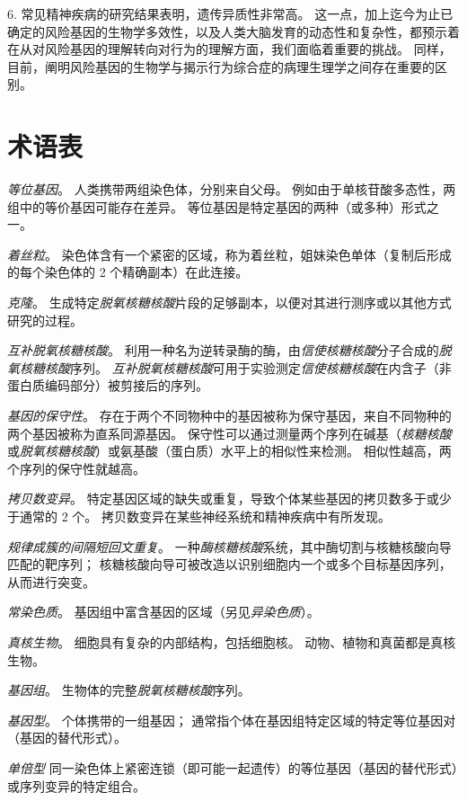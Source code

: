 6. 常见精神疾病的研究结果表明，遗传异质性非常高。
这一点，加上迄今为止已确定的风险基因的生物学多效性，以及人类大脑发育的动态性和复杂性，都预示着在从对风险基因的理解转向对行为的理解方面，我们面临着重要的挑战。
同样，目前，阐明风险基因的生物学与揭示行为综合症的病理生理学之间存在重要的区别。



\section{术语表} \label{sec:genes:glossary}

\textit{等位基因}。
人类携带两组染色体，分别来自父母。
例如由于单核苷酸多态性，两组中的等价基因可能存在差异。
等位基因是特定基因的两种（或多种）形式之一。


\textit{着丝粒}。
染色体含有一个紧密的区域，称为着丝粒，姐妹染色单体（复制后形成的每个染色体的 2 个精确副本）在此连接。


\textit{克隆}。
生成特定\textit{脱氧核糖核酸}片段的足够副本，以便对其进行测序或以其他方式研究的过程。


\textit{互补脱氧核糖核酸}。
利用一种名为逆转录酶的酶，由\textit{信使核糖核酸}分子合成的\textit{脱氧核糖核酸}序列。
\textit{互补脱氧核糖核酸}可用于实验测定\textit{信使核糖核酸}在内含子（非蛋白质编码部分）被剪接后的序列。


\textit{基因的保守性}。
存在于两个不同物种中的基因被称为保守基因，来自不同物种的两个基因被称为直系同源基因。
保守性可以通过测量两个序列在​​碱基（\textit{核糖核酸}或\textit{脱氧核糖核酸}）或氨基酸（蛋白质）水平上的相似性来检测。
相似性越高，两个序列的保守性就越高。


\textit{拷贝数变异}。
特定基因区域的缺失或重复，导致个体某些基因的拷贝数多于或少于通常的 2 个。
拷贝数变异在某些神经系统和精神疾病中有所发现。


\textit{规律成簇的间隔短回文重复}。
一种\textit{酶核糖核酸}系统，其中酶切割与核糖核酸向导匹配的靶序列；
核糖核酸向导可被改造以识别细胞内一个或多个目标基因序列，从而进行突变。


\textit{常染色质}。
基因组中富含基因的区域（另见\textit{异染色质}）。


\textit{真核生物}。
细胞具有复杂的内部结构，包括细胞核。
动物、植物和真菌都是真核生物。


\textit{基因组}。
生物体的完整\textit{脱氧核糖核酸}序列。


\textit{基因型}。
个体携带的一组基因；
通常指个体在基因组特定区域的特定等位基因对（基因的替代形式）。


\textit{单倍型}
同一染色体上紧密连锁（即可能一起遗传）的等位基因（基因的替代形式）或序列变异的特定组合。


